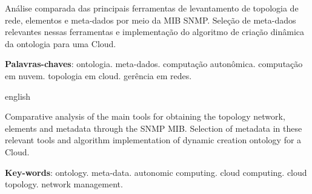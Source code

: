 \documentclass[12pt,openright,twoside,a4paper,english,brazil]{abntex2}
\begin{document}
\begin{resumo}

Análise comparada das principais ferramentas de levantamento de topologia de
rede, elementos e meta-dados por meio da MIB SNMP. Seleção de meta-dados
relevantes nessas ferramentas e implementação do algoritmo de criação dinâmica
da ontologia para uma Cloud.
 \vspace{\onelineskip}
    
 \noindent
 \textbf{Palavras-chaves}: ontologia. meta-dados. computação autonômica.
 computação em nuvem. topologia em cloud. gerência em redes.
\end{resumo}

\begin{resumo}[Abstract]
 \begin{otherlanguage*}{english}
 
Comparative analysis of the main tools for obtaining the topology network,
elements and metadata through the SNMP MIB. Selection of metadata in these
relevant tools and algorithm implementation of dynamic creation ontology for a
Cloud.

   \vspace{\onelineskip}
 
   \noindent 
   \textbf{Key-words}: ontology. meta-data. autonomic computing. cloud
   computing. cloud topology. network management.
 \end{otherlanguage*}
\end{resumo}




\textual










% 







\postextual
\end{document}
